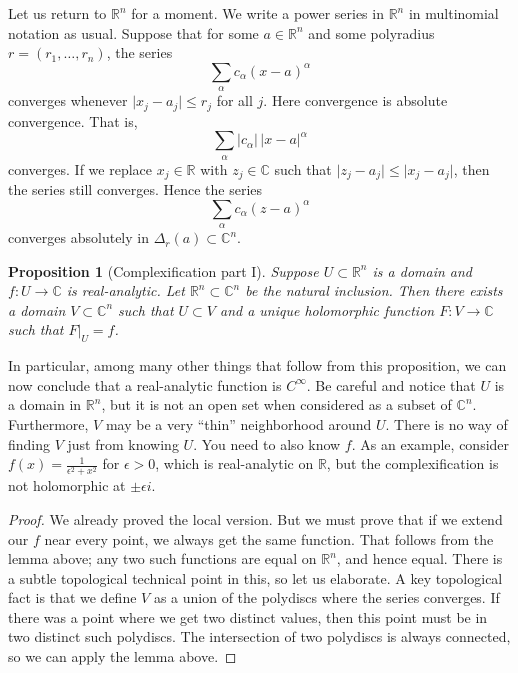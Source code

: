 \documentclass[12pt,openany]{book}
\newcommand{\sabs}[1]{\lvert {#1} \rvert}
\newcommand{\C}{{\mathbb{C}}}
\newcommand{\R}{{\mathbb{R}}}
\theoremstyle{plain}
\newtheorem{prop}[thm]{Proposition}
\theoremstyle{remark}
\theoremstyle{definition}
\theoremstyle{exercise}
\theoremstyle{example}
\begin{document}
Let us return to $\R^n$ for a moment.
We write a power series in $\R^n$ in multinomial notation as usual.
Suppose that for some
$a \in \R^n$
and some polyradius
$r=(r_1,\ldots,r_n)$,
the series
\begin{equation*}
\sum_{\alpha} c_{\alpha} {(x-a)}^\alpha
\end{equation*}
converges whenever $\sabs{x_j-a_j} \leq r_j$ for all $j$.
Here convergence is absolute convergence.  That is,
\begin{equation*}
\sum_{\alpha} \sabs{c_{\alpha}}\, \sabs{x-a}^\alpha
\end{equation*}
converges.
If we replace $x_j \in \R$ with $z_j \in \C$ such that
$\sabs{z_j-a_j} \leq \sabs{x_j-a_j}$, then the series still converges.
Hence the series
\begin{equation*}
\sum_{\alpha} c_{\alpha} {(z-a)}^\alpha
\end{equation*}
converges absolutely in $\Delta_r(a) \subset \C^n$.

\begin{prop}[Complexification part I]
Suppose $U \subset \R^n$ is a domain and
$f \colon U \to \C$ is real-analytic.
Let $\R^n \subset \C^n$ be the natural inclusion.
Then there exists a domain $V \subset \C^n$ such that $U \subset V$
and a unique holomorphic function $F \colon V \to \C$ such that $F|_U = f$.
\end{prop}

In particular, among many other things that follow from this proposition, we
can now conclude that a real-analytic function is $C^\infty$.  Be careful
and notice that $U$ is a domain in $\R^n$, but it is not an open set
when considered as a subset of $\C^n$.  Furthermore, $V$ may be a very
``thin'' neighborhood around $U$.  There is no way of finding $V$ just from
knowing $U$.  You need to also know $f$.
As an example, consider
$f(x) = \frac{1}{\epsilon^2+x^2}$ for $\epsilon > 0$, which is
real-analytic on $\R$, but the complexification is not holomorphic at $\pm
\epsilon i$.

\begin{proof}
We already proved the local version.  But we must prove that if we
extend our $f$ near every point, we always get the same function.
That follows from the lemma above; any two such functions are
equal on $\R^n$, and hence equal.  There is a subtle topological technical
point in this, so let us elaborate.  A key topological fact is that we define
$V$ as a union of the polydiscs where the series converges.  If there was a
point where we get two distinct values, then this point must be in two
distinct such polydiscs.  The intersection of two polydiscs is always
connected, so we can apply the lemma above.
\end{proof}
\end{document}
